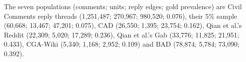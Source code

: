 The seven populations (comments; units; reply edges; gold prevalence) are Civil Comments reply threads (1{,}251{,}487; 270{,}967; 980{,}520; 0.076), their 5\% sample (60{,}668; 13{,}467; 47{,}201; 0.075), CAD (26{,}550; 1{,}395; 23{,}754; 0.162), Qian et al.'s Reddit (22{,}309; 5{,}020; 17{,}289; 0.236), Qian et al.'s Gab (33{,}776; 11{,}825; 21{,}951; 0.433), CGA-Wiki (5{,}340; 1{,}168; 2{,}952; 0.109) and BAD (78{,}874; 5{,}784; 73{,}090; 0.392).
